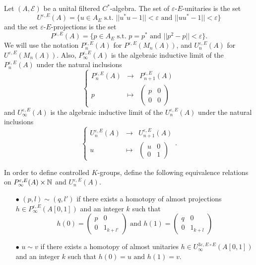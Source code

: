 \begin{definition}
Let $(A,\mathcal E)$ be a unital filtered $C^*$-algebra. The set of $\varepsilon$-$E$-unitaries is the set 
\[U^{\varepsilon, E}(A)= \{u\in A_E \text{ s.t. } ||u^*u-1||<\varepsilon\text{ and }||uu^*-1||<\varepsilon \}\]
and the set $\varepsilon$-$E$-projections is the set 
\[P^{\varepsilon, E}(A)= \{p\in A_E \text{ s.t. } p=p^*\text{ and }||p^2-p||<\varepsilon \}.\]
We will use the notation $P_n^{\varepsilon, E}(A)$ for $P^{\varepsilon, E}(M_n(A))$, and $U_n^{\varepsilon, E}(A)$ for $U^{\varepsilon, E}(M_n(A))$. Also, $P_\infty^{\varepsilon, E}(A)$ is the algebraic inductive limit of the $P_n^{\varepsilon, E}(A)$ under the natural inclusions
\[\left\{\begin{array}{rcl}
	P^{\varepsilon,E}_n(A) 		& \rightarrow	& P^{\varepsilon,E}_{n+1}(A)\\ 
	p 		& \mapsto 	& \begin{pmatrix}p& 0 \\ 0&0 \end{pmatrix}
\end{array}\right.\]
and $U_\infty^{\varepsilon, E}(A)$ is the algebraic inductive limit of the $U_n^{\varepsilon, E}(A)$ under the natural inclusions
\[\left\{\begin{array}{rcl}
	U^{\varepsilon,E}_n(A) 		& \rightarrow	& U^{\varepsilon,E}_{n+1}(A)\\ 
	u 		& \mapsto 	& \begin{pmatrix}u & 0 \\ 0& 1 \end{pmatrix}
\end{array}\right. .\]
\end{definition}

In order to define controlled $K$-groups, define the following equivalence relations on $P^{\varepsilon, E}_\infty(A)\times \mathbb N$ and $U^{\varepsilon,E}_n(A)$.
\begin{itemize}

\item[$\bullet$] $(p,l) \sim (q,l')$ if there exists a homotopy of almost projections $h\in P^{\varepsilon, E}_\infty(A[0,1])$ and an integer $k$ such that 
\[h(0)=\begin{pmatrix} p & 0 \\ 0 & 1_{k+l'} \end{pmatrix} \text{ and }
h(1)=\begin{pmatrix} q & 0 \\ 0 & 1_{k+l} \end{pmatrix}\]
\item[$\bullet$] $u \sim v$ if there exists a homotopy of almost unitaries $h\in U^{3\varepsilon, E\circ E}_\infty(A[0,1])$ and an integer $k$ such that $h(0)= u \text{ and }h(1)=v$.\\
\end{itemize}

